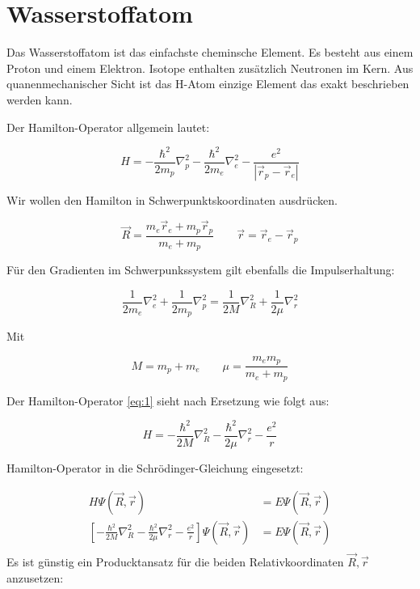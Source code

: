 

\usepackage{amsmath}                %


\section*{Wasserstoffatom}

Das Wasserstoffatom ist das einfachste cheminsche Element. Es besteht aus einem Proton und einem Elektron. Isotope enthalten zusätzlich Neutronen im Kern. Aus quanenmechanischer Sicht ist das H-Atom einzige Element das exakt beschrieben werden kann. 

Der Hamilton-Operator allgemein lautet:

\begin{equation}
  \label{eq:1}
  H = -\frac{\hbar^2}{2m_p}\nabla^2_p - \frac{\hbar^2}{2m_{e}}\nabla^2_e - \frac{e^2}{|\vec r_p-\vec r_e|}
\end{equation}

Wir wollen den Hamilton in Schwerpunktskoordinaten ausdrücken.

\begin{equation}
  \label{eq:2}
  \vec R = \frac{m_e\vec r_e + m_p\vec r_p}{m_e+m_p} \qquad \vec r = \vec r_e-\vec r_p
\end{equation}

Für den Gradienten im Schwerpunkssystem gilt ebenfalls die Impulserhaltung:

\begin{equation}
  \label{eq:3}
  \frac{1}{2m_e}\nabla_e^2 + \frac{1}{2m_p}\nabla_p^2 = \frac{1}{2M}\nabla_R^2 + \frac{1}{2\mu}\nabla_r^2
\end{equation}

Mit

\begin{equation}
  \label{eq:5}
  M = m_p+m_e\qquad \mu = \frac{m_em_p}{m_e+m_p}
\end{equation}

Der Hamilton-Operator \eqref{eq:1} sieht nach Ersetzung wie folgt aus:

\begin{equation}
  \label{eq:4}
  H = -\frac{\hbar^2}{2M}\nabla^2_R - \frac{\hbar^2}{2\mu}\nabla^2_r - \frac{e^2}{r}
\end{equation}

Hamilton-Operator in die Schrödinger-Gleichung eingesetzt:

\begin{align}
  \label{eq:6}
  H\Psi(\vec R,\vec r) &= E\Psi(\vec R,\vec r) \\
\left[-\frac{\hbar^2}{2M}\nabla^2_R - \frac{\hbar^2}{2\mu}\nabla^2_r - \frac{e^2}{r}\right]\Psi(\vec R,\vec r) &= E\Psi(\vec R,\vec r) \\
\end{align}
Es ist günstig ein Producktansatz für die beiden Relativkoordinaten \(\vec R,\vec r\) anzusetzen:

